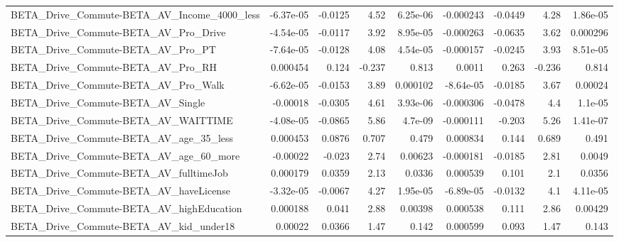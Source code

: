 \begin{tabular}{lrrrrrrrr}
BETA\_Drive\_Commute-BETA\_AV\_Income\_4000\_less        &   -6.37e-05 &      -0.0125 &      4.52 & 6.25e-06 &  -0.000243 &     -0.0449 &         4.28 &      1.86e-05 \\
BETA\_Drive\_Commute-BETA\_AV\_Pro\_Drive               &   -4.54e-05 &      -0.0117 &      3.92 & 8.95e-05 &  -0.000263 &     -0.0635 &         3.62 &      0.000296 \\
BETA\_Drive\_Commute-BETA\_AV\_Pro\_PT                  &   -7.64e-05 &      -0.0128 &      4.08 & 4.54e-05 &  -0.000157 &     -0.0245 &         3.93 &      8.51e-05 \\
BETA\_Drive\_Commute-BETA\_AV\_Pro\_RH                  &    0.000454 &        0.124 &    -0.237 &    0.813 &     0.0011 &       0.263 &       -0.236 &         0.814 \\
BETA\_Drive\_Commute-BETA\_AV\_Pro\_Walk                &   -6.62e-05 &      -0.0153 &      3.89 & 0.000102 &  -8.64e-05 &     -0.0185 &         3.67 &       0.00024 \\
BETA\_Drive\_Commute-BETA\_AV\_Single                  &    -0.00018 &      -0.0305 &      4.61 & 3.93e-06 &  -0.000306 &     -0.0478 &          4.4 &       1.1e-05 \\
BETA\_Drive\_Commute-BETA\_AV\_WAITTIME                &   -4.08e-05 &      -0.0865 &      5.86 &  4.7e-09 &  -0.000111 &      -0.203 &         5.26 &      1.41e-07 \\
BETA\_Drive\_Commute-BETA\_AV\_age\_35\_less             &    0.000453 &       0.0876 &     0.707 &    0.479 &   0.000834 &       0.144 &        0.689 &         0.491 \\
BETA\_Drive\_Commute-BETA\_AV\_age\_60\_more             &    -0.00022 &       -0.023 &      2.74 &  0.00623 &  -0.000181 &     -0.0185 &         2.81 &        0.0049 \\
BETA\_Drive\_Commute-BETA\_AV\_fulltimeJob             &    0.000179 &       0.0359 &      2.13 &   0.0336 &   0.000539 &       0.101 &          2.1 &        0.0356 \\
BETA\_Drive\_Commute-BETA\_AV\_haveLicense             &   -3.32e-05 &      -0.0067 &      4.27 & 1.95e-05 &  -6.89e-05 &     -0.0132 &          4.1 &      4.11e-05 \\
BETA\_Drive\_Commute-BETA\_AV\_highEducation           &    0.000188 &        0.041 &      2.88 &  0.00398 &   0.000538 &       0.111 &         2.86 &       0.00429 \\
BETA\_Drive\_Commute-BETA\_AV\_kid\_under18             &     0.00022 &       0.0366 &      1.47 &    0.142 &   0.000599 &       0.093 &         1.47 &         0.143 \\

\end{tabular}
